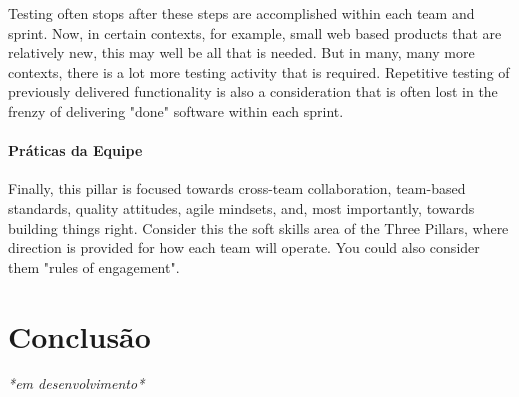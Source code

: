 \documentclass[
	12pt,				%
	openright,			%
	oneside,			%
	a4paper,			%
	english,			%
	brazil,				%
	]{abntex2}
\begin{document}
Testing often stops after these steps are accomplished within each team and sprint. Now, in certain contexts, for example, small web based products that are relatively new, this may well be all that is needed. But in many, many more contexts, there is a lot more testing activity that is required. Repetitive testing of previously delivered functionality is also a consideration that is often lost in the frenzy of delivering "done" software within each sprint.

\subsubsection{Práticas da Equipe}
Finally, this pillar is focused towards cross-team collaboration, team-based standards, quality attitudes, agile mindsets, and, most importantly, towards building things right. Consider this the soft skills area of the Three Pillars, where direction is provided for how each team will operate. You could also consider them "rules of engagement".

% 

\chapter*[Conclusão]{Conclusão}

\emph{*em desenvolvimento*}


\postextual


%


%
%


\printindex
\end{document}
